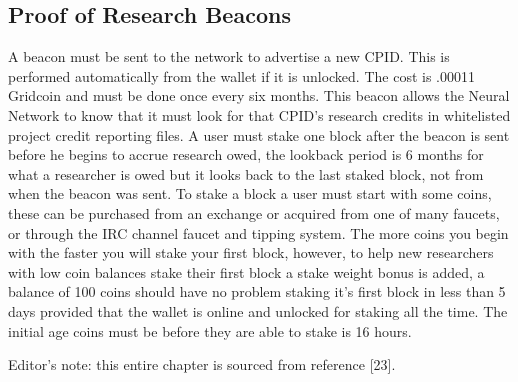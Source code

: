\subsection{Proof of Research Beacons}

A beacon must be sent to the network to advertise a new CPID. This is performed automatically from the wallet if it is unlocked. The cost is .00011 Gridcoin and must be done once every six months. This beacon allows the Neural Network to know that it must look for that CPID's research credits in whitelisted project credit reporting files. A user must stake one block after the beacon is sent before he begins to accrue research owed, the lookback period is 6 months for what a researcher is owed but it looks back to the last staked block, not from when the beacon was sent. To stake a block a user must start with some coins, these can be purchased from an exchange or acquired from one of many faucets, or through the IRC channel faucet and tipping system. The more coins you begin with the faster you will stake your first block, however, to help new researchers with low coin balances stake their first block a stake weight bonus is added, a balance of 100 coins should have no problem staking it's first block in less than 5 days provided that the wallet is online and unlocked for staking all the time. The initial age coins must be before they are able to stake is 16 hours.

Editor's note: this entire chapter is sourced from reference [23].\\
